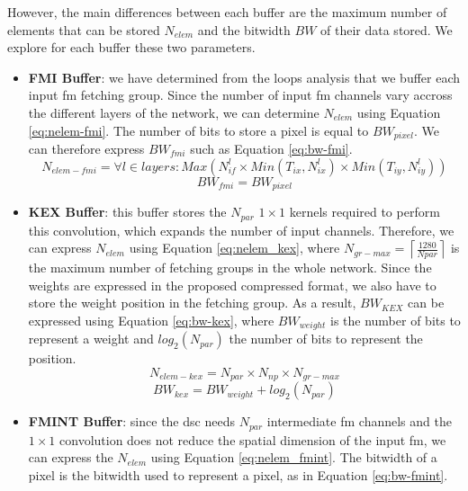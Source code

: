 However, the main differences between each buffer are the maximum number of elements that can be stored $N_{elem}$ and the bitwidth $BW$ of their data stored. We explore for each buffer these two parameters.
\begin{itemize}
    \item \textbf{FMI Buffer}: we have determined from the loops analysis that we buffer each input \acrshort{fm} fetching group. Since the number of input \acrshort{fm} channels vary accross the different layers of the network, we can determine $N_{elem}$ using Equation \eqref{eq:nelem-fmi}. The number of bits to store a pixel is equal to $BW_{pixel}$. We can therefore express $BW_{fmi}$ such as Equation \eqref{eq:bw-fmi}.
    \begin{equation}
        N_{elem-fmi} = \forall l \in layers: Max\left( N_{if}^l \times Min\left(T_{ix}, N_{ix}^l\right) \times Min\left(T_{iy}, N_{iy}^l\right) \right)
        \label{eq:nelem-fmi}
    \end{equation}
    \begin{equation}
        BW_{fmi} = BW_{pixel}
        \label{eq:bw-fmi}
    \end{equation}
    \item \textbf{KEX Buffer}: this buffer stores the $N_{par}$ $1 \times 1$ kernels required to perform this convolution, which expands the number of input channels. Therefore, we can express $N_{elem}$ using Equation \eqref{eq:nelem_kex}, where $N_{gr-max} = \left\lceil \frac{1280}{Npar} \right\rceil$ is the maximum number of fetching groups in the whole network. Since the weights are expressed in the proposed compressed format, we also have to store the weight position in the fetching group.
    As a result, $BW_{KEX}$ can be expressed using Equation \eqref{eq:bw-kex}, where $BW_{weight}$ is the number of bits to represent a weight and $log_2(N_{par})$ the number of bits to represent the position.
    \begin{equation}
        N_{elem-kex} = N_{par} \times N_{np} \times N_{gr-max}
        \label{eq:nelem_kex}
    \end{equation}
    \begin{equation}
        BW_{kex} = BW_{weight} + log_2(N_{par})
        \label{eq:bw-kex}
    \end{equation}
    \item \textbf{FMINT Buffer}: since the \acrshort{dsc} needs $N_{par}$ intermediate \acrshort{fm} channels and the $1 \times 1$ convolution does not reduce the spatial dimension of the input \acrshort{fm}, we can express the $N_{elem}$ using Equation \eqref{eq:nelem_fmint}. The bitwidth of a pixel is the bitwidth used to represent a pixel, as in Equation \eqref{eq:bw-fmint}.

\end{itemize}

